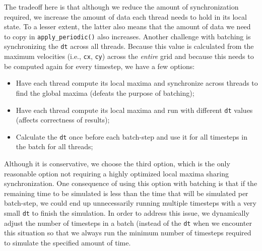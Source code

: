 The tradeoff here is that although we reduce the amount of
synchronization required, we increase the amount of data each thread
needs to hold in its local state. To a lesser extent, the latter also
means that the amount of data we need to copy in
\texttt{apply\_periodic()} also increases. Another challenge with batching
is synchronizing the \texttt{dt} across all threads. Because this value
is calculated from the maximum velocities (i.e., \texttt{cx},
\texttt{cy}) across the \emph{entire} grid and because this needs to be
computed again for every timestep, we have a few options:

\begin{itemize}
  \item Have each thread compute its local maxima and synchronize across
    threads to find the global maxima (defeats the purpose of batching);
  \item Have each thread compute its local maxima and run with different
    \texttt{dt} values (affects correctness of results);
  \item Calculate the \texttt{dt} once before each batch-step and use it
    for all timesteps in the batch for all threads;
\end{itemize}

Although it is conservative, we choose the third option, which is the
only reasonable option not requiring a highly optimized local maxima
sharing synchronization. One consequence of using this option with
batching is that if the remaining time to be simulated is less than the
time that will be simulated per batch-step, we could end up unnecessarily
running multiple timesteps with a very small \texttt{dt} to finish the
simulation. In order to address this issue, we dynamically adjust the
number of timesteps in a batch (instead of the \texttt{dt} when we
encounter this situation so that we always run the minimum number of
timesteps required to simulate the specified amount of time.




